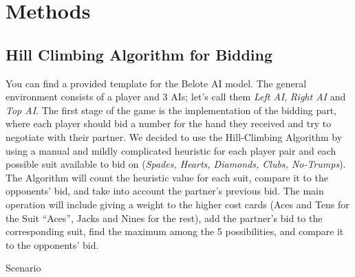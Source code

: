 \section{Methods}\label{ModelDescription}
\subsection{Hill Climbing Algorithm for Bidding}
\hspace{\parindent}You can find a provided template for the Belote AI model.
The general environment consists of a player and 3 AIs; let’s call them \textit{Left
AI}, \textit{Right AI} and \textit{Top AI}. The first stage of the game is the implementation of
the bidding part, where each player should bid a number for the hand they received
and try to negotiate with their partner. We decided to use the Hill-Climbing Algorithm by
using a manual and mildly complicated heuristic for each player pair and each
possible suit available to bid on (\textit{Spades, Hearts, Diamonds, Clubs, No-Trumps}). The
Algorithm will count the heuristic value for each suit, compare it to the opponents’
bid, and take into account the partner’s previous bid. The main operation will include
giving a weight to the higher cost cards (Aces and Tens for the Suit “Aces”, Jacks and
Nines for the rest), add the partner’s bid to the corresponding suit, find the maximum
among the 5 possibilities, and compare it to the opponents’ bid.
\par Scenario


